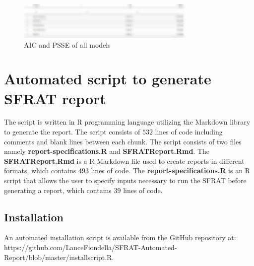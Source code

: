 \documentclass[conference]{IEEEtran}
\begin{document}
\begin{figure}[!h]
\centering
\includegraphics[width=3.4in]{Figures/SRT_tab4_table}
\caption{AIC and PSSE of all models}
\label{fig_SRT_tab4_table}
\end{figure}


\section{Automated script to generate SFRAT report}\label{sec:Script}
The script is written in R programming language utilizing the Markdown library to generate the report. The script consists of $532$ lines of code including comments and blank lines between each chunk. The script consists of two files namely \textbf{report-specifications.R} and \textbf{SFRATReport.Rmd}. The \textbf{SFRATReport.Rmd} is a R Markdown file used to create reports in different formats, which contains $493$ lines of code. The \textbf{report-specifications.R} is an R script that allows the user to specify inputs necessary to run the SFRAT before generating a report, which contains $39$ lines of code.

\subsection{Installation}\label{sec:ScriptInstall}
An automated installation script is available from the GitHub repository at: https://github.com/LanceFiondella/SFRAT-Automated-Report/blob/master/installscript.R.
\end{document}
